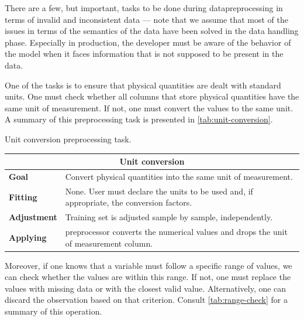 There are a few, but important, tasks to be done during \gls{datapreprocessing} in terms of
invalid and inconsistent data --- note that we assume that most of the issues in terms of
the semantics of the data have been solved in the data handling phase.  Especially in
production, the developer must be aware of the behavior of the model when it faces
information that is not supposed to be present in the data.

One of the tasks is to ensure that physical quantities are dealt with standard units.  One must
check whether all columns that store physical quantities have the same unit of
measurement.  If not, one must convert the values to the same unit.  A summary of this
preprocessing task is presented in \cref{tab:unit-conversion}.

\begin{tablebox}[label=tab:unit-conversion]{Unit conversion preprocessing task.}
  \centering
  \begin{tabular}{lp{6cm}}
    \toprule
    \multicolumn{2}{c}{\textbf{Unit conversion}} \\
    \midrule
    \textbf{Goal} &
      Convert physical quantities into the same unit of measurement. \\
    \textbf{Fitting} &
      None. User must declare the units to be used and, if appropriate, the conversion
      factors. \\
    \textbf{Adjustment} &
      Training set is adjusted sample by sample, independently. \\
    \textbf{Applying} &
      \Gls{preprocessor} converts the numerical values and drops the unit of measurement column.  \\
    \bottomrule
  \end{tabular}
\end{tablebox}

Moreover, if one knows that a variable must follow a specific range of values, we can check
whether the values are within this range.  If not, one must replace the values with
missing data or with the closest valid value.  Alternatively, one can discard the
observation based on that criterion.  Consult \cref{tab:range-check} for a summary of this
operation.

